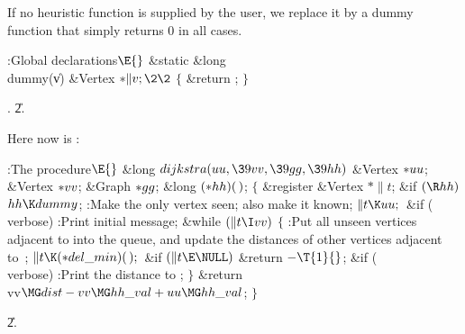 If no heuristic function is supplied by the user, we replace it by a
dummy function that simply returns 0 in all cases.

\Y\B\4:Global declarations\X${}\E{}$\6
\&{static} \&{long} \\{dummy}(\|v)\1\1\6
\&{Vertex} ${}{*}\|v;\2\2{}$\6
${}\{{}$\5
\1\&{return} ;\5
${}\}{}$\2\par
{}.
\U2.\fi

Here now is :

\Y\B\4:The  procedure\X${}\E{}$\6
\&{long} ${}\\{dijkstra}(\\{uu},\39\\{vv},\39\\{gg},\39\\{hh}){}$\1\1\6
\&{Vertex} ${}{*}\\{uu}{}$;\6
\&{Vertex} ${}{*}\\{vv}{}$;\6
\&{Graph} ${}{*}\\{gg}{}$;\6
\&{long} ${}({*}\\{hh})(\,){}$;\2\2\6
${}\{{}$\5
\1\&{register} \&{Vertex} ${}{*}\|t{}$;\7
\&{if} ${}(\R\\{hh}){}$\1\5
${}\\{hh}\K\\{dummy}{}$;\2\6
:Make  the only vertex seen; also make it known\X;\6
${}\|t\K\\{uu};{}$\6
\&{if} (\\{verbose})\1\5
:Print initial message\X;\2\6
\&{while} ${}(\|t\I\\{vv}){}$\5
${}\{{}$\1\6
:Put all unseen vertices adjacent to  into the queue, and update
the distances of other vertices adjacent to~\X;\6
${}\|t\K({*}\\{del\_min})(\,);{}$\6
\&{if} ${}(\|t\E\NULL){}$\1\5
\&{return} ${}{-}\T{1}{}$;\2\6
\&{if} (\\{verbose})\1\5
:Print the distance to \X;\2\6
\4${}\}{}$\2\6
\&{return} \\{vv}${}\MG\\{dist}-\\{vv}\MG\\{hh\_val}+\\{uu}\MG\\{hh\_val}{}$;%
\6
\4${}\}{}$\2\par
\U2.\fi

